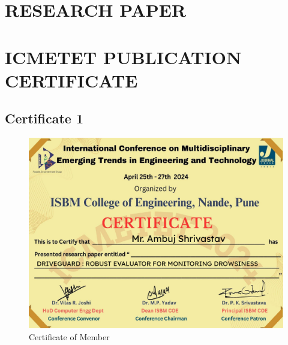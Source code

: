 \documentclass[12pt]{article}
\begin{document}
\section{RESEARCH PAPER}

\newpage
\section{ICMETET PUBLICATION CERTIFICATE}
\subsection{Certificate 1}
\begin{figure}[htbp]
    \centering
    \includegraphics[width=1\textwidth]{cert.pdf} 
    \caption{Certificate of Member}
\end{figure}
\end{document}
